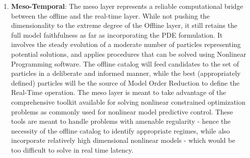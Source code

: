 \documentclass{article}
\newcommand{\1}{\mathds{1}}          %
\theoremstyle{definition}
\begin{document}
\begin{sloppypar}
\begin{enumerate}
\begin{table}[H]
    \centering
    \caption{Operational purpose and resource requirements for Offline Computation}
    \label{tab:offline}
\end{table}

    
    \item \textbf{Meso-Temporal}: The meso layer represents a reliable computational bridge between the offline and the real-time layer. While not pushing the dimensionality to the extreme degree of the Offline layer, it still retains the full model faithfulness as far as incorporating the PDE formulation. It involves the steady evolution of a moderate number of particles representing potential solutions, and applies procedures that can be solved using Nonlinear Programming software. The offline catalog will feed candidates to the set of particles in a deliberate and informed manner, while the best (appropriately defined) particles will be the source of Model Order Reduction to define the Real-Time operation. The meso layer is meant to take advantage of the comprehensive toolkit available for solving nonlinear constrained optimization problems as commonly used for nonlinear model predictive control. These tools are meant to handle problems with amenable regularity - hence the necessity of the offline catalog to identify appropriate regimes, while also incorporate relatively high dimensional nonlinear models - which would be too difficult to solve in real time latency.
    

\end{enumerate}
\end{sloppypar}
\end{document}

